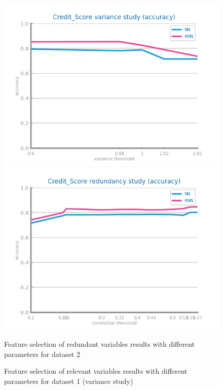 \documentclass[10pt]{extarticle}
\begin{document}
\begin{figure}[H]
\centering\includegraphics[scale=0.60]{images/dataset2/data_preparation/Credit_Score_fs_low_var_accuracy_study_.png}
\includegraphics[scale=0.60]{images/dataset2/data_preparation/Credit_Score_fs_redundancy_accuracy_study.png}
\caption{Feature selection of redundant variables results with different parameters for dataset 2}
\end{figure}

\begin{figure}[H]
\caption{Feature selection of relevant variables results with different parameters for dataset 1 (variance study)} 
\end{figure}
\end{document}
